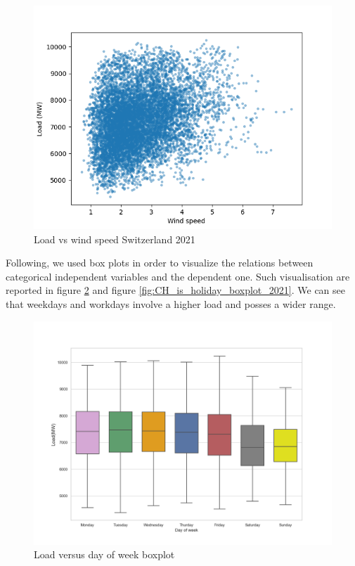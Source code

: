 \begin{figure}[!h]
    \includegraphics[width=\textwidth]{images/CH_load_vs_wind_speed_2021.png}
    \caption{Load vs wind speed Switzerland 2021}
    \label{fig:CH_load_vs_wind_speed_2021}
\end{figure}

Following, we used box plots in order to visualize the relations between categorical independent variables and the dependent one. Such visualisation are reported in figure \ref{fig:CH_day_of_week_boxplot_2021} and figure \ref{fig:CH_is_holiday_boxplot_2021}. We can see that weekdays and workdays involve a higher load and posses a wider range.

\begin{figure}[!h]
    \includegraphics[width=\textwidth]{images/CH_day_of_week_boxplot_2021.png}
    \caption{Load versus day of week boxplot}
    \label{fig:CH_day_of_week_boxplot_2021}
\end{figure}


